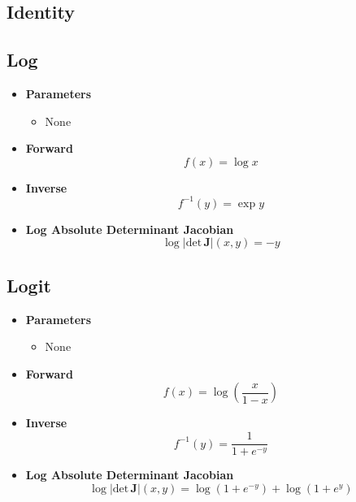 \subsection{Identity}

\subsection{Log}
\begin{itemize}
  \item \textbf{Parameters}
  \begin{itemize}
    \item None
  \end{itemize}
  \item \textbf{Forward}
  \begin{equation}
    f(x) = \log x
  \end{equation}
  \item \textbf{Inverse}
  \begin{equation}
    f^{-1}(y) = \exp y
  \end{equation}
  \item \textbf{Log Absolute Determinant Jacobian}
  \begin{equation}
    \log \vert \text{det} \, \mathbf{J} \vert (x, y) = - y
  \end{equation}
\end{itemize}

\subsection{Logit}
\begin{itemize}
  \item \textbf{Parameters}
  \begin{itemize}
    \item None
  \end{itemize}
  \item \textbf{Forward}
  \begin{equation}
    f(x) = \log \left( \frac{x}{1 - x} \right)
  \end{equation}
  \item \textbf{Inverse}
  \begin{equation}
    f^{-1}(y) = \frac{1}{1 + e^{-y}}
  \end{equation}
  \item \textbf{Log Absolute Determinant Jacobian}
  \begin{equation}
    \log \vert \text{det} \, \mathbf{J} \vert (x, y) = \log\left( 1 + e^{-y} \right) + \log\left( 1 + e^{y} \right)
  \end{equation}
\end{itemize}

